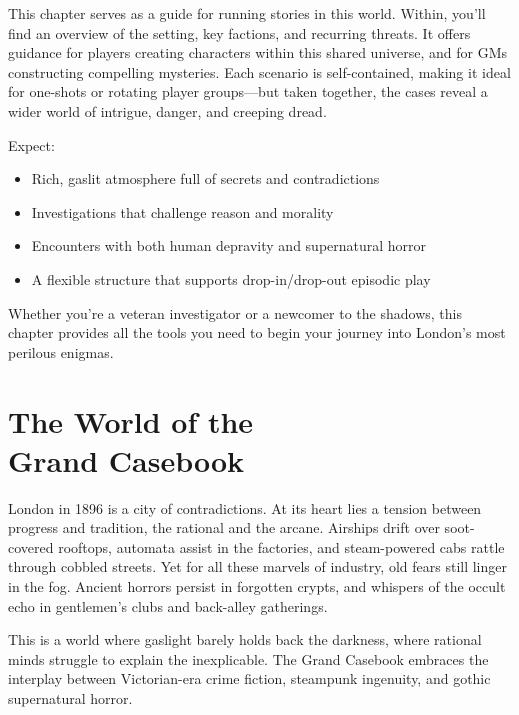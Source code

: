 This chapter serves as a guide for running stories in this world. Within, you'll find an overview of the setting, key factions, and recurring threats. It offers guidance for players creating characters within this shared universe, and for GMs constructing compelling mysteries. Each scenario is self-contained, making it ideal for one-shots or rotating player groups—but taken together, the cases reveal a wider world of intrigue, danger, and creeping dread.

\newcolumn
\noindent Expect:
\begin{itemize}\raggedright
    \item Rich, gaslit atmosphere full of secrets and contradictions
    \item Investigations that challenge reason and morality
    \item Encounters with both human depravity and supernatural horror
    \item A flexible structure that supports drop-in/drop-out episodic play
\end{itemize}

Whether you’re a veteran investigator or a newcomer to the shadows, this chapter provides all the tools you need to begin your journey into London’s most perilous enigmas.


\section[The World of the Grand Casebook]{The World of the\\ Grand Casebook}

London in 1896 is a city of contradictions. At its heart lies a tension between progress and tradition, the rational and the arcane. Airships drift over soot-covered rooftops, automata assist in the factories, and steam-powered cabs rattle through cobbled streets. Yet for all these marvels of industry, old fears still linger in the fog. Ancient horrors persist in forgotten crypts, and whispers of the occult echo in gentlemen’s clubs and back-alley gatherings.

This is a world where gaslight barely holds back the darkness, where rational minds struggle to explain the inexplicable. The Grand Casebook embraces the interplay between Victorian-era crime fiction, steampunk ingenuity, and gothic supernatural horror.

